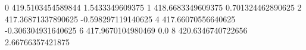 0 419.5103454589844 1.5433349609375
1 418.6683349609375 0.701324462890625
2 417.36871337890625 -0.598297119140625
4 417.66070556640625 -0.306304931640625
6 417.9670104980469 0.0
8 420.6346740722656 2.66766357421875
